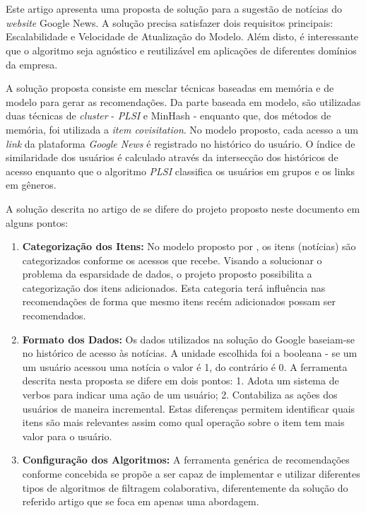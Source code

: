 \documentclass[
	12pt,				%
    oneside,			%
	a4paper,			%
	english,			%
	french,				%
	spanish,			%
	brazil,				%
	]{abntex2}
\begin{document}
\section{}
Este artigo apresenta uma proposta de solução para a sugestão de notícias do \textit{website} Google News. A solução precisa satisfazer dois requisitos principais:
Escalabilidade e Velocidade de Atualização do Modelo. Além disto, é interessante que o algoritmo seja agnóstico e reutilizável em aplicações de diferentes domínios 
da empresa.

A solução proposta consiste em mesclar técnicas baseadas em memória e de modelo para gerar as recomendações. Da parte baseada em modelo, são utilizadas duas técnicas
de \textit{cluster} - \textit{PLSI} e MinHash - enquanto que, dos métodos de memória, foi utilizada a \textit{item covisitation}. No modelo proposto, cada acesso a um 
\textit{link} da plataforma \textit{Google News} é registrado no histórico do usuário. O índice de similaridade dos usuários é calculado através da intersecção dos
históricos de acesso enquanto que o algoritmo \textit{PLSI} classifica os usuários em grupos e os links em gêneros.

A solução descrita no artigo de  se difere do projeto proposto neste documento em alguns pontos:

\begin{enumerate}
	\item \textbf{Categorização dos Itens:} No modelo proposto por , os itens (notícias) são categorizados conforme os acessos que recebe. Visando a solucionar
	o problema da esparsidade de dados,	 o projeto proposto possibilita a categorização dos itens adicionados. Esta categoria terá influência nas recomendações de forma que mesmo itens recém adicionados
	possam ser recomendados.
	\item \textbf{Formato dos Dados:} Os dados utilizados na solução do Google baseiam-se no histórico de acesso às notícias. A unidade escolhida foi a booleana - se um
	um usuário acessou uma notícia o valor é 1, do contrário é 0. A ferramenta descrita nesta proposta se difere em dois pontos: 1. Adota um sistema de verbos para indicar uma ação de um usuário;
	2. Contabiliza as ações dos usuários de maneira incremental. Estas diferenças permitem identificar quais itens são mais relevantes assim como qual operação sobre o item tem mais valor para o usuário.
	\item \textbf{Configuração dos Algoritmos:} A ferramenta genérica de recomendações conforme concebida se propõe a ser capaz de implementar e utilizar diferentes tipos de algoritmos de filtragem colaborativa,
	diferentemente da solução do referido artigo que se foca em apenas uma abordagem.
\end{enumerate}
\end{document}
